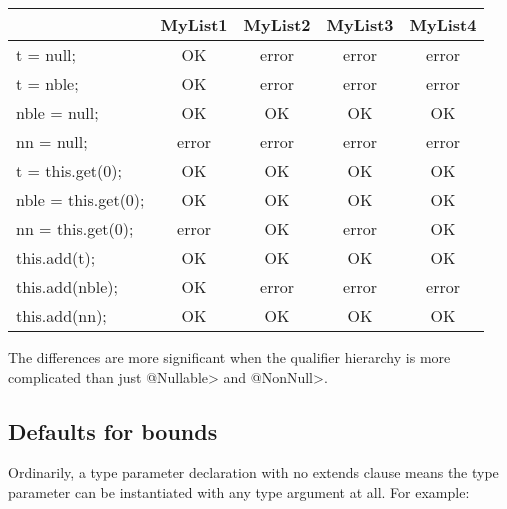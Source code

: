 \begin{tabular}{|l|c|c|c|c|} \hline
                        & MyList1 & MyList2 & MyList3 & MyList4 \\ \hline
  t = null;             & OK      & error   & error   & error   \\ \hline
  t = nble;             & OK      & error   & error   & error   \\ \hline
  nble = null;          & OK      & OK      & OK      & OK      \\ \hline
  nn = null;            & error   & error   & error   & error   \\ \hline
  t = this.get(0);      & OK      & OK      & OK      & OK      \\ \hline
  nble = this.get(0);   & OK      & OK      & OK      & OK      \\ \hline
  nn = this.get(0);     & error   & OK      & error   & OK      \\ \hline
  this.add(t);          & OK      & OK      & OK      & OK      \\ \hline
  this.add(nble);       & OK      & error   & error   & error   \\ \hline
  this.add(nn);         & OK      & OK      & OK      & OK      \\ \hline
\end{tabular}


\medskip

The differences are more
significant when the qualifier hierarchy is more complicated than just
\<@Nullable> and \<@NonNull>.


\subsection{Defaults for bounds}
Ordinarily, a type parameter declaration with no extends clause means the
type parameter can be instantiated with any type argument at all.  For
example:

